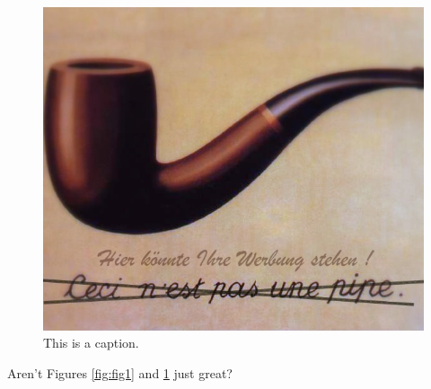 \begin{figure}
\centering
\includegraphics[width=\textwidth]{figures/Part1/random_image_2.png}%
\caption{This is a caption.}
\label{fig:fig2}
\end{figure}



\lipsum[1-2]

Aren't Figures \ref{fig:fig1} and \ref{fig:fig2} just great?



